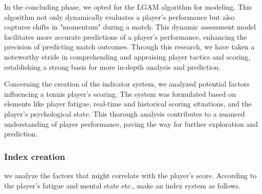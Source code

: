 \documentclass{article}
\begin{document}
In the concluding phase, we opted for the LGAM algorithm for modeling. This algorithm not only dynamically evaluates a player's performance but also captures shifts in "momentum" during a match. This dynamic assessment model facilitates more accurate predictions of a player's performance, enhancing the precision of predicting match outcomes. Through this research, we have taken a noteworthy stride in comprehending and appraising player tactics and scoring, establishing a strong basis for more in-depth analysis and prediction.

Concerning the creation of the indicator system, we analyzed potential factors influencing a tennis player's scoring. The system was formulated based on elements like player fatigue, real-time and historical scoring situations, and the player's psychological state. This thorough analysis contributes to a nuanced understanding of player performance, paving the way for further exploration and prediction.

\subsubsection{Index creation}
we analyze the factors that might correlate with the player's score. According to the player's fatigue and mental state etc., make an index system as follows.
\end{document}
